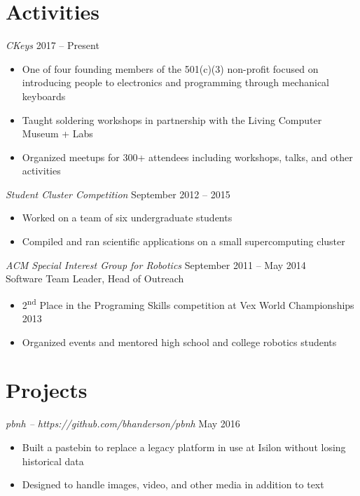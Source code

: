 \documentclass[line,margin]{res}
\begin{document}
\begin{resume}
  \section{\textcolor{TealBlue}{Activities}}
    {\sl CKeys\/} \hfill 2017 -- Present %
      \begin{itemize}
	\setlength{\itemsep}{-2pt}
        \item One of four founding members of the 501(c)(3) non-profit focused on introducing people to electronics and programming through mechanical keyboards %
        \item Taught soldering workshops in partnership with the Living Computer Museum + Labs
        \item Organized meetups for 300+ attendees including workshops, talks, and other activities
      \end{itemize}

    {\sl Student Cluster Competition\/} \hfill September 2012 -- 2015 %
      \begin{itemize}
	\setlength{\itemsep}{-2pt}
        \item Worked on a team of six undergraduate students
        \item Compiled and ran scientific applications on a small supercomputing cluster
      \end{itemize}
  
    {\sl ACM Special Interest Group for Robotics\/} \hfill September 2011 -- May 2014 \\%
      Software Team Leader, Head of Outreach
      \begin{itemize}
	\setlength{\itemsep}{-2pt}
        \item 2\textsuperscript{nd} Place in the Programing Skills competition at Vex World Championships 2013
        \item Organized events and mentored high school and college robotics students
      \end{itemize}
    
  \section{\textcolor{TealBlue}{Projects}}
    {\sl pbnh -- https://github.com/bhanderson/pbnh\/} \hfill May 2016 %
      \begin{itemize}
	\setlength{\itemsep}{-2pt}
        \item Built a pastebin to replace a legacy platform in use at Isilon without losing historical data
        \item Designed to handle images, video, and other media in addition to text
      \end{itemize}


\end{resume}
\end{document}
